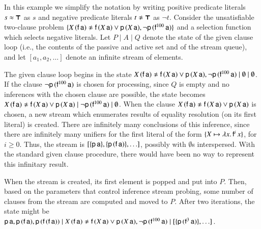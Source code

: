 \newcommand\infstream[1]{[#1]}

\begin{exa} 
  \begin{sloppypar}
  In this example we simplify the notation by writing positive predicate literals
  $s \approx \pmb{\top}$ as $s$ and negative predicate literals $t \noteq \itrue$ as $\neg t$.
  Consider the unsatisfiable two-clause problem $\{ X \, (\mathsf{f} \,
  \mathsf{a}) \not\approx \mathsf{f} \, (X \, \mathsf{a}) \lor \mathsf{p} \, (X \, \mathsf{a}),\allowbreak
  \neg \mathsf{p} \, (\mathsf{f}^{100} \, \mathsf{a})  \}$ and a selection function which
  selects negative literals. 
  Let $P \mid A \mid Q$ denote
  the state of the given clause loop (i.e., the contents of the passive and active set
  and of the stream queue), and let $\infstream{ a_1, a_2, \ldots }$
  denote an infinite stream of elements.
  \end{sloppypar}

  The given clause loop begins in the state $X \, (\mathsf{f} \, \mathsf{a}) \not\approx
  \mathsf{f} \, (X \, \mathsf{a}) \lor \mathsf{p} \, (X \, \mathsf{a}), \neg \mathsf{p} \,
  (\mathsf{f}^{100} \, \mathsf{a}) \mid \emptyset \mid \emptyset$. If the clause $\neg
  \mathsf{p} \, (\mathsf{f}^{100} \, \mathsf{a})$ is chosen for processing, since $Q$ is empty
  and no inferences with the chosen clause are possible, the state becomes $X \,
  (\mathsf{f} \, \mathsf{a}) \not\approx \mathsf{f} \, (X \, \mathsf{a}) \lor \mathsf{p} \, (X \,
  \mathsf{a}) \mid \neg \mathsf{p} \, (\mathsf{f}^{100} \, \mathsf{a}) \mid \emptyset$. When
  the clause $X \, (\mathsf{f} \, \mathsf{a}) \not\approx \mathsf{f} \, (X \, \mathsf{a}) \lor
  \mathsf{p} \, (X \, \mathsf{a})$ is chosen, a new stream which enumerates results of
  equality resolution (on its first literal) is created. There are infinitely many
  conclusions of this inference, since there are infinitely many unifiers for the
  first literal of the form $\{ X \mapsto \lambda x. \, \mathsf{f}^i \, x \}$, for
  $i \geq 0$. Thus, the stream is $\infstream{ \{\cst{p} \, \cst{a}\}, \{\cst{p} \, (\cst{f}\,\cst{a})\}, \ldots }$,
  possibly with $\emptyset$s interspersed. With the standard given clause procedure,
  there would have been no way to represent this infinitary result.

  When the stream is created, its first element is popped and put into $P$. Then, based on the
  parameters that control inference stream probing, some number of clauses from
  the stream are computed and moved to $P$. After two iterations, the state might be
  $ \cst{p} \,
  \cst{a}, \cst{p} \, (\cst{f} \, \cst{a}), \allowbreak \cst{p} \, (\cst{f} \, (\cst{f} \, \cst{a}))   \mid X \,
  (\cst{f} \, \cst{a}) \not\eq \cst{f} \, (X \, \cst{a}) \lor \cst{p} \, (X \,
  \cst{a}), \neg \cst{p} \, (\cst{f}^{100} \, \cst{a}) \mid \infstream{ \{\cst{p} \, (\cst{f}^3\,\cst{a})\}, \ldots }$. 
  

\end{exa}
